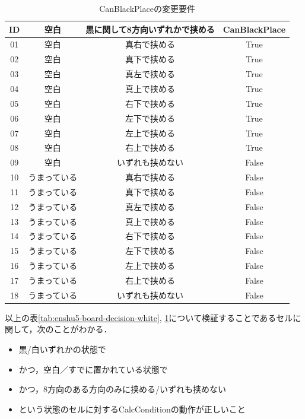 \documentclass[platex,dvipdfmx,12pt]{jsarticle}
\begin{document}
\begin{table}[H]
  \centering
  \caption{CanBlackPlaceの変更要件}
  \label{tab:enshu5-board-decision-black}
  \begin{tabular}{cccc}
    ID & 空白 & 黒に関して8方向いずれかで挟める & CanBlackPlace \\
    \hline
    01 & 空白 & 真右で挟める & True \\
    02 & 空白 & 真下で挟める & True \\
    03 & 空白 & 真左で挟める & True \\
    04 & 空白 & 真上で挟める & True \\
    05 & 空白 & 右下で挟める & True \\
    06 & 空白 & 左下で挟める & True \\
    07 & 空白 & 左上で挟める & True \\
    08 & 空白 & 右上で挟める & True \\
    09 & 空白 & いずれも挟めない & False \\
    10 & うまっている & 真右で挟める & False \\
    11 & うまっている & 真下で挟める & False \\
    12 & うまっている & 真左で挟める & False \\
    13 & うまっている & 真上で挟める & False \\
    14 & うまっている & 右下で挟める & False \\
    15 & うまっている & 左下で挟める & False \\
    16 & うまっている & 左上で挟める & False \\
    17 & うまっている & 右上で挟める & False \\
    18 & うまっている & いずれも挟めない & False \\
  \end{tabular}
\end{table}


以上の表\ref{tab:enshu5-board-decision-white}, \ref{tab:enshu5-board-decision-black}について検証することであるセルに関して，次のことがわかる．

\begin{itemize}
  \item 黒/白いずれかの状態で
  \item かつ，空白／すでに置かれている状態で
  \item かつ，8方向のある方向のみに挟める/いずれも挟めない
  \item という状態のセルに対するCalcConditionの動作が正しいこと
\end{itemize}
\end{document}

